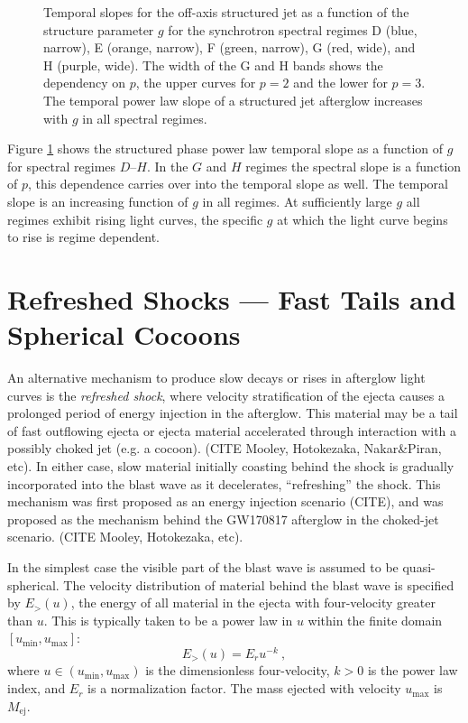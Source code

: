 \documentclass[twocolumn]{aastex62}
\newcommand{\Mej}{\ensuremath{M_{\mathrm{ej}}}}
\newcommand{\umin}{\ensuremath{u_{\mathrm{min}}}}
\newcommand{\umax}{\ensuremath{u_{\mathrm{max}}}}
\begin{document}
\begin{figure}
	\caption{Temporal slopes for the off-axis structured jet as a function of the structure parameter $g$ for the synchrotron spectral regimes D (blue, narrow), E (orange, narrow),  F (green, narrow), G (red, wide), and H (purple, wide).  The width of the G and H bands shows the dependency on $p$, the upper curves for $p=2$ and the lower for $p=3$.  The temporal power law slope of a structured jet afterglow increases with $g$ in all spectral regimes. \label{fig:slopesG}}
\end{figure}

Figure \ref{fig:slopesG} shows the structured phase power law temporal slope as a function of $g$ for spectral regimes $D$--$H$. In the $G$ and $H$ regimes the spectral slope is a function of $p$, this dependence carries over into the temporal slope as well. The temporal slope is an increasing function of $g$ in all regimes.  At sufficiently large $g$ all regimes exhibit rising light curves, the specific $g$ at which the light curve begins to rise is regime dependent.

\section{Refreshed Shocks --- Fast Tails and Spherical Cocoons}\label{sec:refreshedShocks}

An alternative mechanism to produce slow decays or rises in afterglow light curves is the \emph{refreshed shock}, where velocity stratification of the ejecta causes a prolonged period of energy injection in the afterglow.  This material may be a tail of fast outflowing ejecta or ejecta material accelerated through interaction with a possibly choked jet (e.g. a cocoon). (CITE Mooley, Hotokezaka, Nakar\&Piran, etc).  In either case, slow material initially coasting behind the shock is gradually incorporated into the blast wave as it decelerates, ``refreshing'' the shock.  This mechanism was first proposed as an energy injection scenario (CITE), and was proposed as the mechanism behind the GW170817 afterglow in the choked-jet scenario. (CITE Mooley, Hotokezaka, etc).

In the simplest case the visible part of the blast wave is assumed to be quasi-spherical.  The velocity distribution of material behind the blast wave is specified by $E_{>}(u)$, the energy of all material in the ejecta with four-velocity greater than $u$.  This is typically taken to be a power law in $u$ within the finite domain $[\umin, \umax]$:
\begin{equation}
	E_>(u) = E_r u^{-k}\ , \label{eq:Eu}
\end{equation}
where $u \in (\umin, \umax)$ is the dimensionless four-velocity, $k>0$ is the power law index, and $E_r$ is a normalization factor.  The mass ejected with velocity $\umax$ is $\Mej$.
\end{document}

